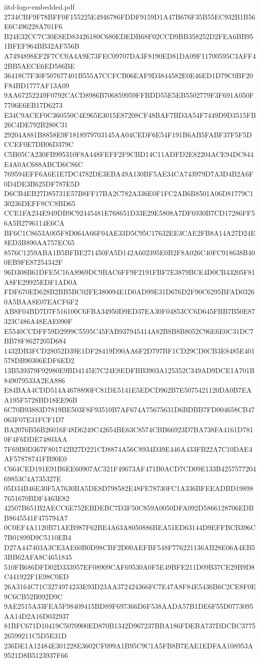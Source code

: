 \begin{filecontents*}[overwrite]{iitd-logo-embedded.pdf}
2734CBF9F78BFF0F155225E4946786FDDF9159D1A47B676F35B55EC932B1B56E6C496228A701F6
B24E32CC7C30E8ED83426180C680EDEDB68F02CCD9BB358252D2FEA6BB951BFEF964BB32AF556B
A7494898EF2F7CC0A4A9E73FEC09707DA3F8190ED81DA09F11700595C3AFF42BB5AECE6ED586BE
36418C7F30F507677401B555A7CCFCB06EAF9D3844582E0E46ED1D79C0BF20F84BD1777AF13A09
9AA67252249F0792CACD8986B706859959FFBDD55E5EB5502779F3F691A050F7706E6EB17D6273
E34C9ACEF0C360550C4E965E3015E87208CF48BAF7BD3A54F7449D9D3515FB26C4DE792B280C31
29204A881B8858E9F1818979703145AA04CEDF6E54F191B6AB5FABF37F5F5DCCEF0E7DB06D379C
C5B05CA230FB995310F8A448FEFF2F9CBD14C11ADFD2E82204ACE94DC844E4A0AC688ABCD6C86C
769594EFF6A6E1E7DC4782DE3EBA49A130BF5AE34CA743979D7A3D4B2A6F0D4DE3B625DF787E5D
D6CB4EB27D85731E57B8FF17BA2C782A336E0F1FC2AB6B8501A06D81779C130236DEFF8CC8BD65
CCE1FA234E949DB9C92445481E768651D33E29E5808A7DF6930B7CD17286FF56A5B2796114E6CA
BF6C1C8653A005F8D064A66F04AE33D5C95C17632EE3CAE2FB8A14A27D24E8ED3B890AA757EC65
8576C1259ABA1B5BFBE271450FA5D142A602395E0B2F8A026C40FC918638B400EB9FE87254342F
96D308B61DFE5C16A8969DC9BAC6FF9F2191FBF7E3879BCE4D0CB43205F81A8FE29925EDF1AD0A
FDF670ED628B2BB5BC02FE380094E1D0AD99E31D676D2F90C6295BFAD03260A5BAA8E07EACF6F2
AB8F04BD7D7F516100C6FBA34950D9ED37EA30F04853CC6D645FBB7B50E87323C486A48EAE090F
E5540CCDFF59D2999C5595C45FAB937945414A82B8B8B8052C96E6E0C31DC7BB78F8627205D684
1432DB3FCD28052D39E1DF28419D90AA6F2D797BF1CD29CD0CB3E8485E401578DB90306EDF6ED2
13B539379F92980E9BD4145E7C24E8EDFBB3903A125352C349AD9DCE1A701B849079533A2EA886
E84BAA4CDD514A4678890FC81DE5141E5EDCD962B7E5075421120DA0B7EAA195F5728BD18EE96B
6C70B93883D7819BE503F8F93510B7AF674A75675631D6BDBB7FD004658CB47063F07E31FCF1D7
BA2076B56B26016F48D6249C42654BE63C8574CBB66923D7BA738FA4161D7810F4F6DDE74803AA
7F69B0D367F801742B27D221CD8874A56C8934D39E446A433FB22A7C10DAE4AF57878741FB90E0
C664CED191E91B6EE60907AC321F49673AF471B0ACD7CD09E133B425757720469853C4A735327E
05D34B46E30F5A7630BA5DE8D798582E48FE78730FC1A336BFEEADBD198987651670BDF4463E82
42507B651B2AECC6E752EBDEBC7D3F50C859A0050DFA092D5866128706EDBB8645541F475794A7
0C0EF4A1120B71AEB987F62BE4A63A8050886BEA51ED63144D9EFFBCB396C7B01899D9C5110EB4
D27A447403A3CE3AE60B0D98CBF2D00AEFBF548F776221136AB28E06A4EB53BB62AFA8C4651845
510FB686DFD02D333957EF08909CAF69530A0F5E49BFE211D09B37CE29B9D8C441922F1E98C0ED
26A3164C71C3274974233E93D23AA372424366FC7E47A8F84E5436B6C2CE8F0E9C6CB52B092D9C
9AE2515A33FEA5F98409415BD89F697366D6F538AADA57B1DE6F55D0773095AA14D2A16D032937
81BFC671D10419C5070900ED870B1342D967237BBA186FDEBA737DDCBC377526599211C5D5E31D
236DE1A12484E301228E3602CF099A1B95C9C1A5FB8B7EAE1EDFAA108953A9521D8B5123937F66

\end{filecontents*}
